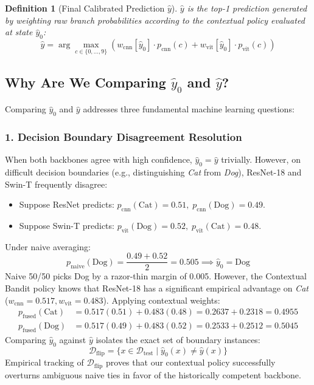 \documentclass[10pt,journal,compsoc]{IEEEtran}
\newtheorem{definition}{Definition}
\begin{document}
\begin{definition}[Final Calibrated Prediction $\hat{y}$]
$\hat{y}$ is the top-1 prediction generated by weighting raw branch probabilities according to the contextual policy evaluated at state $\hat{y}_0$:
\begin{equation}
\hat{y} = \arg\max_{c \in \{0, \dots, 9\}} \left( w_{\text{cnn}}[\hat{y}_0] \cdot p_{\text{cnn}}(c) + w_{\text{vit}}[\hat{y}_0] \cdot p_{\text{vit}}(c) \right)
\end{equation}
\end{definition}

\subsection{Why Are We Comparing $\hat{y}_0$ and $\hat{y}$?}
Comparing $\hat{y}_0$ and $\hat{y}$ addresses three fundamental machine learning questions:

\subsubsection{1. Decision Boundary Disagreement Resolution}
When both backbones agree with high confidence, $\hat{y}_0 = \hat{y}$ trivially. However, on difficult decision boundaries (e.g., distinguishing \textit{Cat} from \textit{Dog}), ResNet-18 and Swin-T frequently disagree:
\begin{itemize}
    \item Suppose ResNet predicts: $p_{\text{cnn}}(\text{Cat}) = 0.51, \; p_{\text{cnn}}(\text{Dog}) = 0.49$.
    \item Suppose Swin-T predicts: $p_{\text{vit}}(\text{Dog}) = 0.52, \; p_{\text{vit}}(\text{Cat}) = 0.48$.
\end{itemize}
Under naive averaging:
\begin{equation}
p_{\text{naive}}(\text{Dog}) = \frac{0.49 + 0.52}{2} = 0.505 \implies \hat{y}_0 = \text{Dog}
\end{equation}
Naive 50/50 picks Dog by a razor-thin margin of 0.005. 
However, the Contextual Bandit policy knows that ResNet-18 has a significant empirical advantage on \textit{Cat} ($w_{\text{cnn}} = 0.517, w_{\text{vit}} = 0.483$). Applying contextual weights:
\begin{align}
p_{\text{fused}}(\text{Cat}) &= 0.517(0.51) + 0.483(0.48) = 0.2637 + 0.2318 = \mathbf{0.4955} \\
p_{\text{fused}}(\text{Dog}) &= 0.517(0.49) + 0.483(0.52) = 0.2533 + 0.2512 = \mathbf{0.5045}
\end{align}
Comparing $\hat{y}_0$ against $\hat{y}$ isolates the exact set of boundary instances:
\begin{equation}
\mathcal{D}_{\text{flip}} = \{ x \in \mathcal{D}_{\text{test}} \mid \hat{y}_0(x) \neq \hat{y}(x) \}
\end{equation}
Empirical tracking of $\mathcal{D}_{\text{flip}}$ proves that our contextual policy successfully overturns ambiguous naive ties in favor of the historically competent backbone.
\end{document}

